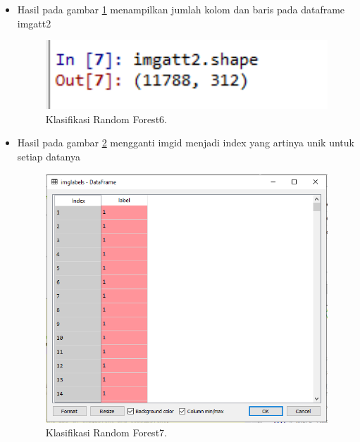 \begin{enumerate}
\begin{itemize}
\item Hasil pada gambar \ref{rons6} menampilkan jumlah kolom dan baris pada dataframe imgatt2
 		\begin{figure}[ht]
		\centerline{\includegraphics[width=1\textwidth]{figures/im/rons6.png}}
		\caption{Klasifikasi Random Forest6.}
		\label{rons6}
		\end{figure}

\item Hasil pada gambar \ref{rons7} mengganti imgid menjadi index yang artinya unik untuk setiap datanya
 		\begin{figure}[ht]
		\centerline{\includegraphics[width=1\textwidth]{figures/im/rons7.png}}
		\caption{Klasifikasi Random Forest7.}
		\label{rons7}
		\end{figure}


\end{itemize}
\end{enumerate}
